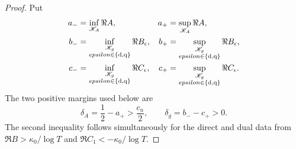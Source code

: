 \begin{proof}
Put
\begin{align*}
 a_-&=\inf_{\mathscr K_A}\Re A,&
 a_+&=\sup_{\mathscr K_A}\Re A,\\
 b_-&=\inf_{\substack{\mathscr K_g\\epsilon\in\{{\rm d},{\rm q}\}}}
          \Re B_\epsilon,&
 b_+&=\sup_{\substack{\mathscr K_g\\epsilon\in\{{\rm d},{\rm q}\}}}
          \Re B_\epsilon,\\
 c_-&=\inf_{\substack{\mathscr K_g\\epsilon\in\{{\rm d},{\rm q}\}}}
          \Re C_\epsilon,&
 c_+&=\sup_{\substack{\mathscr K_g\\epsilon\in\{{\rm d},{\rm q}\}}}
          \Re C_\epsilon.
\end{align*}
The two positive margins used below are
\begin{equation}\label{eq:source-compact-margins}
 \delta_A=\frac12-a_+>\frac{c_u}{2},
 \qquad
 \delta_g=b_--c_+>0.
\end{equation}
The second inequality follows simultaneously for the direct and dual data
from $\Re B>\kappa_0/\log T$ and
$\Re C_1<-\kappa_0/\log T$.


\end{proof}
